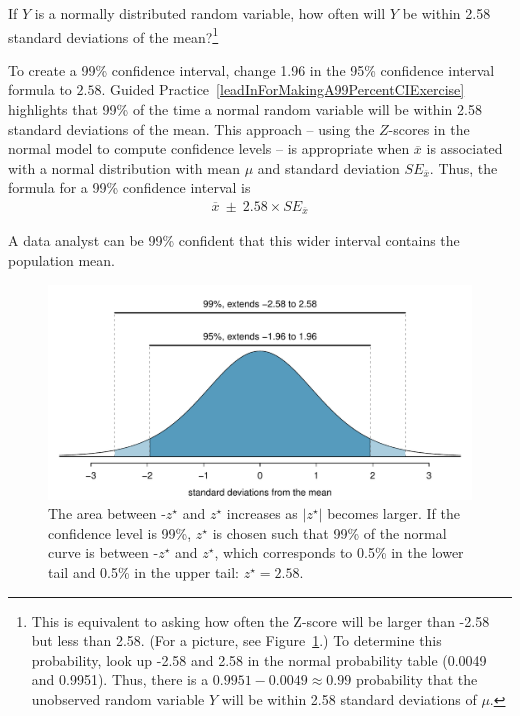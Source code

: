 \begin{spacing}{1.5}
\begin{exercise} \label{leadInForMakingA99PercentCIExercise}
If $Y$ is a normally distributed random variable, how often will $Y$ be within 2.58 standard deviations of the mean?\footnote{This is equivalent to asking how often the Z-score will be larger than -2.58 but less than 2.58. (For a picture, see Figure~\ref{choosingZForCI}.) To determine this probability, look up -2.58 and 2.58 in the normal probability table (0.0049 and 0.9951). Thus, there is a $0.9951-0.0049 \approx 0.99$ probability that the unobserved random variable $Y$ will be within 2.58 standard deviations of $\mu$.}
\end{exercise}

To create a 99\% confidence interval, change 1.96 in the 95\% confidence interval formula to  $2.58$. Guided Practice~\ref{leadInForMakingA99PercentCIExercise} highlights that 99\% of the time a normal random variable will be within 2.58 standard deviations of the mean. This approach -- using the $Z$-scores in the normal model to compute confidence levels -- is appropriate when $\overline{x}$ is associated with a normal distribution with mean $\mu$ and standard deviation $SE_{\overline{x}}$. Thus, the formula for a 99\% confidence interval is
\begin{eqnarray}
\overline{x}\ \pm\ 2.58\times SE_{\overline{x}}
\label{99PercCIForMean}
\end{eqnarray}

A data analyst can be 99\% confident that this wider interval contains the population mean.


\begin{figure}[h]
\centering
\includegraphics[width=\textwidth]
{ch_inference_foundations_oi_biostat/figures/choosingZForCI/choosingZForCI}
\caption{The area between -$z^{\star}$ and $z^{\star}$ increases as $|z^{\star}|$ becomes larger. If the confidence level is 99\%, $z^{\star}$ is chosen such that 99\% of the normal curve is between -$z^{\star}$ and $z^{\star}$, which corresponds to 0.5\% in the lower tail and 0.5\% in the upper tail: $z^{\star}=2.58$.}
\label{choosingZForCI}
\end{figure}


\end{spacing}
